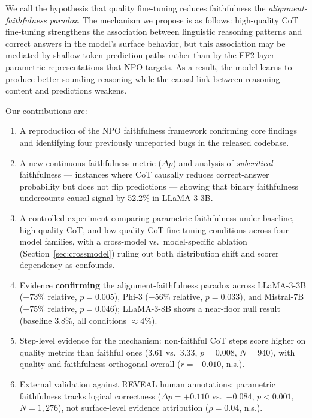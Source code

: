 \documentclass[11pt]{article}
\begin{document}
We call the hypothesis that quality fine-tuning reduces faithfulness the
\emph{alignment-faithfulness paradox}. The mechanism we propose is as
follows: high-quality CoT fine-tuning strengthens the association between
linguistic reasoning patterns and correct answers in the model's surface
behavior, but this association may be mediated by shallow token-prediction
paths rather than by the FF2-layer parametric representations that NPO
targets. As a result, the model learns to produce better-sounding reasoning
while the causal link between reasoning content and predictions weakens.

Our contributions are:
\begin{enumerate}
  \item A reproduction of the NPO faithfulness framework confirming core
        findings and identifying four previously unreported bugs in the
        released codebase.
  \item A new continuous faithfulness metric ($\Delta p$) and analysis of
        \emph{subcritical} faithfulness --- instances where CoT causally
        reduces correct-answer probability but does not flip predictions ---
        showing that binary faithfulness undercounts causal signal by
        52.2\% in LLaMA-3-3B.
  \item A controlled experiment comparing parametric faithfulness under
        baseline, high-quality CoT, and low-quality CoT fine-tuning conditions
        across four model families, with a cross-model vs.\ model-specific
        ablation (Section~\ref{sec:crossmodel}) ruling out both distribution
        shift and scorer dependency as confounds.
  \item Evidence \textbf{confirming} the alignment-faithfulness paradox across
        LLaMA-3-3B ($-$73\% relative, $p = 0.005$), Phi-3
        ($-$56\% relative, $p = 0.033$), and Mistral-7B
        ($-$75\% relative, $p = 0.046$); LLaMA-3-8B shows a
        near-floor null result (baseline 3.8\%, all conditions $\approx$4\%).
  \item Step-level evidence for the mechanism: non-faithful CoT steps score
        higher on quality metrics than faithful ones (3.61 vs.\ 3.33,
        $p = 0.008$, $N = 940$), with quality and faithfulness orthogonal
        overall ($r = -0.010$, n.s.).
  \item External validation against REVEAL human annotations: parametric
        faithfulness tracks logical correctness ($\Delta p{=}{+}0.110$
        vs.\ $-0.084$, $p < 0.001$, $N = 1{,}276$), not surface-level
        evidence attribution ($\rho = 0.04$, n.s.).
\end{enumerate}
\end{document}

